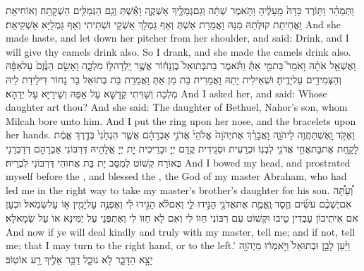 {וַתְּמַהֵ֗ר וַתּ֤וֹרֶד כַּדָּהּ֙ מֵֽעָלֶ֔יהָ וַתֹּ֣אמֶר שְׁתֵ֔ה וְגַם\maqqaf גְּמַלֶּ֖יךָ אַשְׁקֶ֑ה וָאֵ֕שְׁתְּ וְגַ֥ם הַגְּמַלִּ֖ים הִשְׁקָֽתָה׃}
{וְאוֹחִיאַת וַאֲחֵיתַת קוּלְּתַהּ מִנַּהּ וַאֲמַרַת אֵשְׁתְּ וְאַף גַּמְלָךְ אַשְׁקֵי וּשְׁתִיתִי וְאַף גַּמְלַיָּא אַשְׁקִיאַת׃}
{And she made haste, and let down her pitcher from her shoulder, and said: Drink, and I will give thy camels drink also. So I drank, and she made the camels drink also.}{}
{וָאֶשְׁאַ֣ל אֹתָ֗הּ וָאֹמַר֮ בַּת\maqqaf מִ֣י אַתְּ֒ וַתֹּ֗אמֶר בַּת\maqqaf בְּתוּאֵל֙ בֶּן\maqqaf נָח֔וֹר אֲשֶׁ֥ר יָֽלְדָה\maqqaf לּ֖וֹ מִלְכָּ֑ה וָאָשִׂ֤ם הַנֶּ֙זֶם֙ עַל\maqqaf אַפָּ֔הּ וְהַצְּמִידִ֖ים עַל\maqqaf יָדֶֽיהָ׃}
{וּשְׁאֵילִית יָתַהּ וַאֲמַרִית בַּת מַן אַתְּ וַאֲמַרַת בַּת בְּתוּאֵל בַּר נָחוֹר דִּילֵידַת לֵיהּ מִלְכָּה וְשַׁוִּיתִי קְדָשָׁא עַל אַפַּהּ וְשֵׁירַיָּא עַל יְדַהָא׃}
{And I asked her, and said: Whose daughter art thou? And she said: The daughter of Bethuel, Nahor’s son, whom Milcah bore unto him. And I put the ring upon her nose, and the bracelets upon her hands.}{}
{וָאֶקֹּ֥ד וָֽאֶשְׁתַּחֲוֶ֖ה לַיהֹוָ֑ה וָאֲבָרֵ֗ךְ אֶת\maqqaf יְהֹוָה֙ אֱלֹהֵי֙ אֲדֹנִ֣י אַבְרָהָ֔ם אֲשֶׁ֤ר הִנְחַ֙נִי֙ בְּדֶ֣רֶךְ אֱמֶ֔ת לָקַ֛חַת אֶת\maqqaf בַּת\maqqaf אֲחִ֥י אֲדֹנִ֖י לִבְנֽוֹ׃}
{וּכְרַעִית וּסְגֵידִית קֳדָם יְיָ וּבָרֵיכִית יָת יְיָ אֱלָהֵיהּ דְּרִבּוֹנִי אַבְרָהָם דְּדַבְּרַנִי בְּאוֹרַח קְשׁוֹט לְמִסַּב יָת בַּת אֲחוּהִי דְּרִבּוֹנִי לִבְרֵיהּ׃}
{And I bowed my head, and prostrated myself before the \lord, and blessed the \lord, the God of my master Abraham, who had led me in the right way to take my master’s brother’s daughter for his son.}{}
{וְ֠עַתָּ֠ה אִם\maqqaf יֶשְׁכֶ֨ם עֹשִׂ֜ים חֶ֧סֶד וֶֽאֱמֶ֛ת אֶת\maqqaf אֲדֹנִ֖י הַגִּ֣ידוּ לִ֑י וְאִם\maqqaf לֹ֕א הַגִּ֣ידוּ לִ֔י וְאֶפְנֶ֥ה עַל\maqqaf יָמִ֖ין א֥וֹ עַל\maqqaf שְׂמֹֽאל׃}
{וּכְעַן אִם אִיתֵיכוֹן עָבְדִין טֵיבוּ וּקְשׁוֹט עִם רִבּוֹנִי חַוּוֹ לִי וְאִם לָא חַוּוֹ לִי וְאֶתְפְּנֵי עַל יַמִּינָא אוֹ עַל שְׂמָאלָא׃}
{And now if ye will deal kindly and truly with my master, tell me; and if not, tell me; that I may turn to the right hand, or to the left.’}{}
{וַיַּ֨עַן לָבָ֤ן וּבְתוּאֵל֙ וַיֹּ֣אמְר֔וּ מֵיְהֹוָ֖ה יָצָ֣א הַדָּבָ֑ר לֹ֥א נוּכַ֛ל דַּבֵּ֥ר אֵלֶ֖יךָ רַ֥ע אוֹ\maqqaf טֽוֹב׃}
